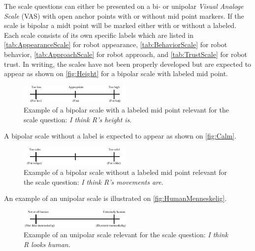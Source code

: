 \noindent
%
The scale questions can either be presented on a bi- or unipolar \textit{Visual Analoge Scale} (VAS) with open anchor points with or without mid point markers. If the scale is bipolar a midt point will be marked either with or without a labeled. Each scale consists of its own specific labels which are listed in \autoref{tab:AppearanceScale} for robot appearance, \autoref{tab:BehaviorScale} for robot behavior, \autoref{tab:ApproachScale} for robot approach, and \autoref{tab:TrustScale} for robot trust. In writing, the scales have not been properly developed but are expected to appear as shown on \autoref{fig:Height} for a bipolar scale with labeled mid point. 
%
\begin{figure}[H]
\centering
\includegraphics[width = 0.49\textwidth]{Figure/HeightHoejde} 
\caption{Example of a bipolar scale with a labeled mid point relevant for the scale question: \textit{I think R's height is}.}
\label{fig:Height}
\end{figure}
\noindent
% 
A bipolar scale without a label is expected to appear as shown on \autoref{fig:Calm}.  
%
\begin{figure}[H]
\centering
\includegraphics[width = 0.49\textwidth]{Figure/CalmWild} 
\caption{Example of a bipolar scale without a labeled mid point relevant for the scale question: \textit{I think R's movements are}.}
\label{fig:Calm}
\end{figure}
\noindent
%
An example of an unipolar scale is illustrated on \autoref{fig:HumanMenneskelig}.
%
\begin{figure}[H]
\centering
\includegraphics[width = 0.49\textwidth]{Figure/HumanMenneskelig} 
\caption{Example of an unipolar scale relevant for the scale question: \textit{I think R looks human}.}
\label{fig:HumanMenneskelig}
\end{figure}
\noindent
%
